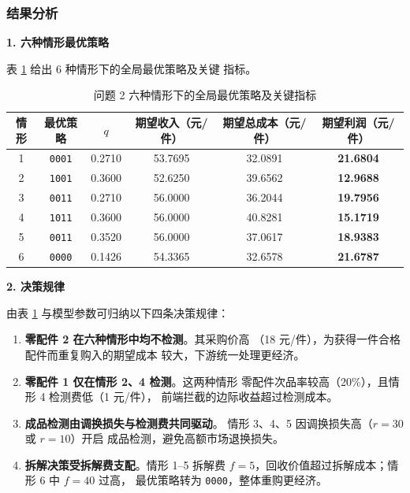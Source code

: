 \documentclass[withoutpreface,bwprint]{cumcmthesis}
\begin{document}
\subsubsection{结果分析}

\textbf{1. 六种情形最优策略}

表 \ref{tab:q2-result} 给出 6 种情形下的全局最优策略及关键
指标。

\begin{table}[htbp]
\centering
\caption{问题 2 六种情形下的全局最优策略及关键指标}
\label{tab:q2-result}
\small
\begin{tabular}{cccccc}
\toprule[1.5pt]
情形 & 最优策略 & $q$ & 期望收入（元/件） & 期望总成本（元/件） & 期望利润（元/件） \\
\midrule[1pt]
1 & \texttt{0001} & 0.2710 & 53.7695 & 32.0891 & \textbf{21.6804} \\
2 & \texttt{1001} & 0.3600 & 52.6250 & 39.6562 & \textbf{12.9688} \\
3 & \texttt{0011} & 0.2710 & 56.0000 & 36.2044 & \textbf{19.7956} \\
4 & \texttt{1011} & 0.3600 & 56.0000 & 40.8281 & \textbf{15.1719} \\
5 & \texttt{0011} & 0.3520 & 56.0000 & 37.0617 & \textbf{18.9383} \\
6 & \texttt{0000} & 0.1426 & 54.3365 & 32.6578 & \textbf{21.6787} \\
\bottomrule[1.5pt]
\end{tabular}
\end{table}

\textbf{2. 决策规律}

由表 \ref{tab:q2-result} 与模型参数可归纳以下四条决策规律：

\begin{enumerate}
    \item \textbf{零配件 2 在六种情形中均不检测}。其采购价高
    （18 元/件），为获得一件合格配件而重复购入的期望成本
    较大，下游统一处理更经济。
    \item \textbf{零配件 1 仅在情形 2、4 检测}。这两种情形
    零配件次品率较高（20\%），且情形 4 检测费低（1 元/件），
    前端拦截的边际收益超过检测成本。
    \item \textbf{成品检测由调换损失与检测费共同驱动}。
    情形 3、4、5 因调换损失高（$r = 30$ 或 $r = 10$）开启
    成品检测，避免高额市场退换损失。
    \item \textbf{拆解决策受拆解费支配}。情形 1--5 拆解费
    $f = 5$，回收价值超过拆解成本；情形 6 中 $f = 40$ 过高，
    最优策略转为 \texttt{0000}，整体重购更经济。
\end{enumerate}
\end{document}
